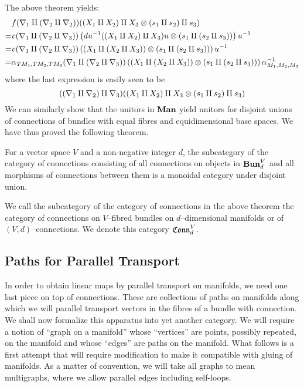\documentclass[./Thick_TQFTs_and_Quantum_Information.tex]{subfiles}
\begin{document}
The above theorem yields:
\begin{align*}
  & f(\nabla_1 \amalg (\nabla_2 \amalg \nabla_2))(
      (X_1 \amalg X_2) \amalg X_3
      \otimes (s_1 \amalg s_2) \amalg s_3
      ) \\
  =& v(\nabla_1 \amalg (\nabla_2 \amalg \nabla_3))\left( 
    du^{-1}((X_1 \amalg X_2) \amalg X_3)u
    \otimes (s_1 \amalg (s_2 \amalg s_3))
   \right)u^{-1}\\
  =& v(\nabla_1 \amalg (\nabla_2 \amalg \nabla_3))\left( 
    (X_1 \amalg (X_2 \amalg X_3))
    \otimes (s_1 \amalg (s_2 \amalg s_3))
   \right)u^{-1} \\
  =& \alpha_{TM_1, TM_2, TM_3}(\nabla_1 \amalg (\nabla_2 \amalg \nabla_3))\left( 
    (X_1 \amalg (X_2 \amalg X_3))
    \otimes (s_1 \amalg (s_2 \amalg s_3))
   \right)\alpha_{M_1, M_2, M_3}^{-1}
\end{align*}
where the last expression is easily seen to be
\[
  ((\nabla_1 \amalg \nabla_2) \amalg \nabla_3)(
    (X_1 \amalg X_2) \amalg X_3 \otimes (s_1 \amalg s_2) \amalg s_3
  )
\]
We can similarly show that the unitors in $\textbf{Man}$ yield unitors for disjoint
unions of connections of bundles with equal fibres and equidimensional base
spaces. We have thus proved the following theorem.
\begin{thm}
For a vector space $V$ and a non-negative integer $d$, the subcategory of the
category of connections consisting of all connections on objects in
$\textbf{Bun}_d^{V}$ and all morphisms of connections between them is a monoidal
category under disjoint union.
\end{thm}
\begin{defn}
We call the subcategory of the category of connections in the above theorem the
category of connections on $V$--fibred bundles on $d$--dimensional manifolds or
of $(V, d)$--connections. We denote this category $\mathfrak{Conn}^V_d$.
\end{defn}

\subsection{Paths for Parallel Transport}

In order to obtain linear maps by parallel transport on manifolds, we need one
last piece on top of connections. These are collections of paths on manifolds
along which we will parallel transport vectors in the fibres of a bundle with
connection. We shall now formalize this apparatus into yet another category. We
will require a notion of ``graph on a manifold'' whose ``vertices'' are points,
possibly repeated, on the manifold and whose ``edges'' are paths on the
manifold. What follows is a first attempt that will require modification to make
it compatible with gluing of manifolds. As a matter of convention, we will take
all graphs to mean multigraphs, where we allow parallel edges including
self-loops.
\end{document}
